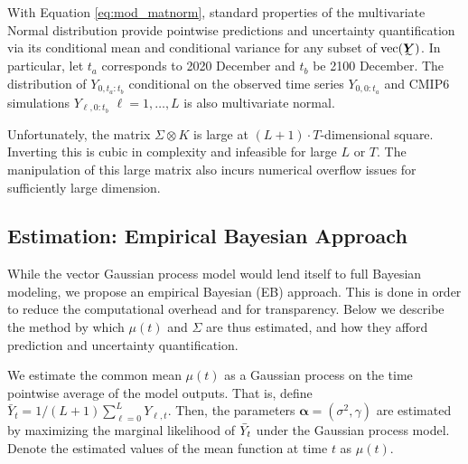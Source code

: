 \documentclass{CUP-JNL-EDS}
\begin{document}
With Equation \ref{eq:mod_matnorm}, standard properties of the multivariate Normal distribution provide pointwise predictions and uncertainty quantification via its conditional mean and conditional variance for any subset of $\operatorname{vec}(\undertilde{\bm{Y}})$. In particular, let $t_a$ corresponds to 2020 December and $t_b$ be 2100 December. The distribution of $Y_{0,t_a:t_b}$ conditional on the observed time series $Y_{0, 0:t_a}$ and CMIP6 simulations $Y_{\ell, 0:t_b}$ $\ell = 1,\dots,L$ is also multivariate normal.

Unfortunately, the matrix $\Sigma \otimes K$ is large at $(L+1)\cdot T$-dimensional square. Inverting this is cubic in complexity and infeasible for large $L$ or $T$. The manipulation of this large matrix also incurs numerical overflow issues for sufficiently large dimension.

\subsection{Estimation: Empirical Bayesian Approach}\label{ss:eb}

While the vector Gaussian process model would lend itself to full Bayesian modeling, we propose an empirical Bayesian (EB) approach. This is done in order to reduce the computational overhead and for transparency. Below we describe the method by which $\mu(t)$ and $\Sigma$ are thus estimated, and how they afford prediction and uncertainty quantification.

We estimate the common mean $\mu(t)$ as a Gaussian process on the time pointwise average of the model outputs. That is, define $\bar{Y}_{t} = 1/(L+1) \sum_{\ell = 0}^{L} Y_{\ell, t}$.
Then, the parameters $\bm{\alpha}=(\sigma^2, \gamma)$ are estimated by maximizing the marginal likelihood of $\Bar{Y}_{t}$ under the Gaussian process model. Denote the estimated values of the mean function at time $t$ as $\hat{\mu}(t)$.
\end{document}
